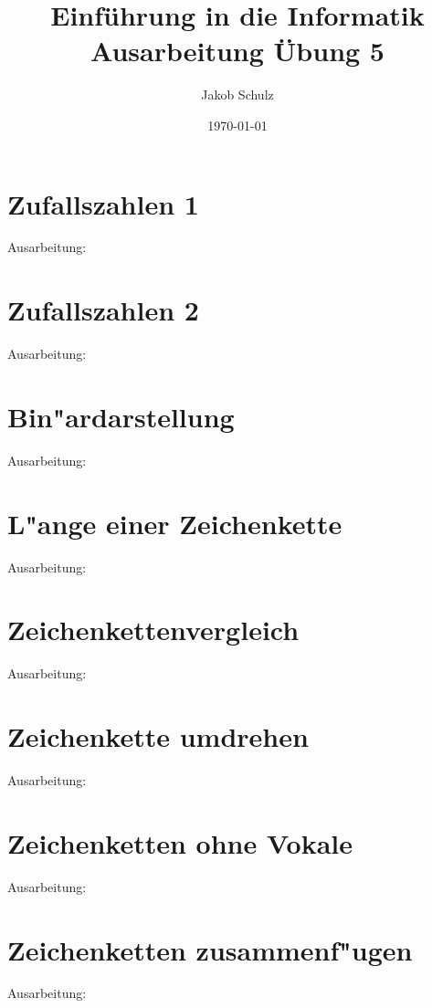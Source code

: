 \documentclass[a4paper,11pt,titlepage]{article}
\begin{document}
\title{Einf\"uhrung in die Informatik\\
Ausarbeitung \"Ubung 5}


\author{Jakob Schulz}


\date{\today}

\maketitle{\thispagestyle{plain}}

\section{Zufallszahlen 1}
Ausarbeitung:
\newpage
\section{Zufallszahlen 2}
Ausarbeitung:
\newpage
\section{Bin"ardarstellung}
Ausarbeitung:
\newpage
\section{L"ange einer Zeichenkette}
Ausarbeitung:
\newpage
\section{Zeichenkettenvergleich}
Ausarbeitung:
\newpage
\section{Zeichenkette umdrehen}
Ausarbeitung:
\newpage
\section{Zeichenketten ohne Vokale}
Ausarbeitung:
\newpage
\section{Zeichenketten zusammenf"ugen}
Ausarbeitung:
\newpage
\end{document}
